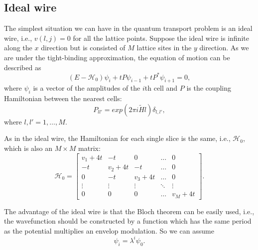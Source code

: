 \documentclass[journal]{IEEEtran}
\begin{document}
\subsection{Ideal wire}
The simplest situation we can have in the quantum transport problem is an ideal wire, i.e., $v(l,j)=0$ for all the
lattice points. Suppose the ideal wire is infinite along the $x$ direction but is consisted of $M$ lattice sites in the
$y$ direction. As we are under the tight-binding approximation, the equation of motion can be described as
\begin{equation}
    (E-\mathcal{H}_0)\psi_i+tP\psi_{i-1}+tP^*\psi_{i+1}=0,
    \label{eq:motion}
\end{equation}
where $\psi_i$ is a vector of the amplitudes of the $i$th cell and $P$ is the coupling Hamiltonian between the nearest
cells:
\begin{equation}
    P_{ll'}=exp(2\pi i\tilde{H}l)\delta_{l,l'},
    \label{eq:P}
\end{equation}
where $l,l'=1,\dots,M$. 

As in the ideal wire, the Hamiltonian for each single slice is the same, i.e., $\mathcal{H}_0$, which is also an
$M\times M$ matrix:
\begin{equation}
    \mathcal{H}_0=\left[
        \begin{array}{ccccc}
            v_1+4t & -t & 0 & \dots & 0 \\
            -t & v_2+4t & -t & \dots & 0 \\
            0 & -t & v_3+4t & \dots & 0 \\
            \vdots & \vdots & \vdots & \ddots & \vdots \\
            0 & 0 & 0 & \dots & v_M+4t
        \end{array} \right].
    \label{eq:H0}
\end{equation}

The advantage of the ideal wire is that the Bloch theorem can be easily used, i.e., the wavefunction should be
constructed by a function which has the same period as the potential multiplies an envelop modulation. So we can assume
\begin{equation} \psi_i=\lambda^i\psi_0.  \label{eq:bloch} \end{equation}
\end{document}
